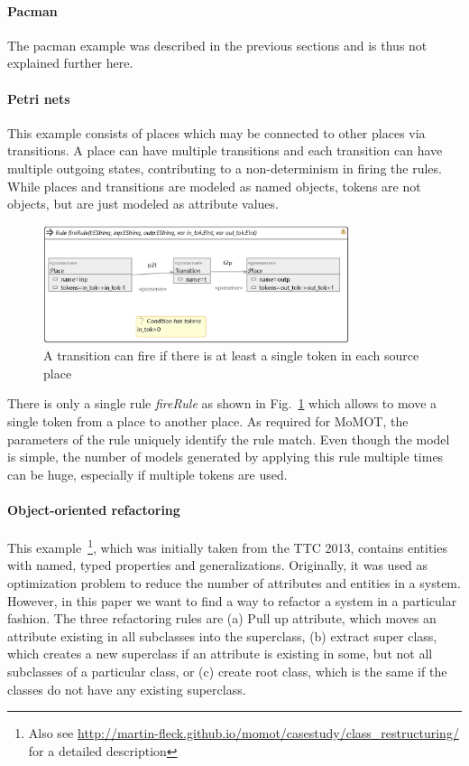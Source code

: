 \paragraph{Pacman} The pacman example was described in the previous sections and is thus not explained further here.

\paragraph{Petri nets}
This example consists of places which may be connected to other places via transitions. A place can have multiple transitions and each transition can have multiple outgoing states, contributing to a non-determinism in firing the rules. While places and transitions are modeled as named objects, tokens are not objects, but are just modeled as attribute values.

\begin{figure}
\centering
\includegraphics[width=0.8\textwidth]{images/firetransition.png}
\caption{A transition can fire if there is at least a single token in each source place}
\label{fig:firerule}
\end{figure}

There is only a single rule \textit{fireRule} as shown in Fig.~\ref{fig:firerule} which allows to move a single token from a place to another place. 
As required for MoMOT, the parameters of the rule uniquely identify the rule match. Even though the model is simple, the number of models generated by applying this rule multiple times can be huge, especially if multiple tokens are used.

\paragraph{Object-oriented refactoring}

This example~\footnote{Also see \url{http://martin-fleck.github.io/momot/casestudy/class_restructuring/} for a detailed description}, which was initially taken from the TTC 2013, contains entities with named, typed properties and generalizations.
Originally, it was used as optimization problem to reduce the number of attributes and entities in a system. However, in this paper
we want to find a way to refactor a system in a particular fashion. The three refactoring rules are (a) Pull up attribute, which moves an attribute existing in all subclasses into the superclass, (b) extract super class, which creates a new superclass if an attribute is existing in some, but not all subclasses of a particular class, or (c) create root class, which is the same if the classes do not have any existing superclass.

